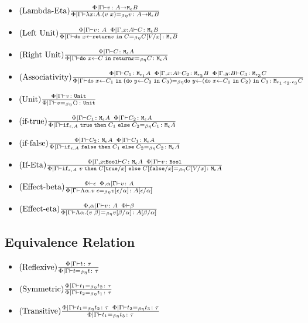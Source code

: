{\begin{itemize}
    \item $\treerule{Lambda-Eta}{\gpetyperelation{v}{\aeb}}{\gpeberelation{\lam{x}{A}{(\apply{v}{x}})}{v}{\aeb}}$
 

    \item $\treerule{Left Unit}{\gpetyperelation{v}{A} \s\s \etyperelation{\P}{\gax}{C}{\meb}}{\gpeberelation{\doin{x}{\return{v}}{C}}{C\ssub{x}{V}}{\meb}}$
    
    \item $\treerule{Right Unit}{\gpetyperelation{C}{\mea}}{\gpeberelation{\doin{x}{C}{\return{x}} }{C}{\mea}}$
    \item $\treerule{Associativity}{\gpetyperelation{C_1}{\M{\e_1}{A}} \s\s \etyperelation{\P}{\gax}{C_2}{\M{\e_2}{B}}\s\s \etyperelation{\P}{\gby}{C_3}{\M{\e_3}{C}}}{
        \gpeberelation{\doin{x}{C_1}{(\doin{y}{C_2}{C_3})}}{\doin{y}{(\doin{x}{C_1}{C_2})}{C_3}}{\M{\e_1 \dot \e_2 \dot \e_3}{C}}
    }$

    \item $\treerule{Unit}{\gpetyperelation{v}{\U}}{\gpeberelation{v}{\u}{\U}}$

    \item $\treerule{if-true}{\gpetyperelation{C_1}{\mea}\s\s\gpetyperelation{C_2}{\mea}}{\gpeberelation{\ifthenelse{\e}{A}{\t}{C_1}{C_2}}{C_1}{\mea}}$
    
    \item $\treerule{if-false}{\gpetyperelation{C_2}{\mea}\s\s\gpetyperelation{C_1}{\mea}}{\gpeberelation{\ifthenelse{\e}{A}{\f}{C_1}{C_2}}{C_2}{\mea}}$
    
    \item $\treerule{If-Eta}{\etyperelation{\P}{\G, x: \B}{C}{\mea}\s\s\gpetyperelation{v}{\B}}{\gpeberelation{\ifthenelse{\e}{A}{v}{C\ssub{x}{\t}}{C\ssub{x}{\f}}}{C\ssub{x}{V}}{\mea}}$
    
    \item $\treerule{Effect-beta}{\wellformed{\P}{\e}\s\s\etyperelation{\P, \a}{\G}{v}{A}}{\gpeberelation{\eapp{\elam{\a}{v}}{\e}}{v\ssub{\a}{\e}}{A\ssub{\a}{\e}}}$

    \item $\treerule{Effect-eta}{\etyperelation{\P,\a}{\G}{v}{A}\s\s\wellformed{\P}{\b}}{\gpeberelation{\elam{\a}{(\eapp{v}{\b})}}{v\ssub{\a}{\b}}{A\ssub{\a}{\b}}}$
    
\end{itemize}
\subsection{Equivalence Relation}
\begin{itemize}
    \item $\treerule{Reflexive}{\gpetyperelation{t}{\tau}}{\gpeberelation{t}{t}{\tau}}$
    \item $\treerule{Symmetric}{\gpeberelation{t_1}{t_2}{\tau}}{\gpeberelation{t_2}{t_1}{\tau}}$
    \item $\treerule{Transitive}{\gpeberelation{t_1}{t_2}{\tau}\s\s\gpeberelation{t_2}{t_3}{\tau}}{\gpeberelation{t_1}{t_3}{\tau}}$
\end{itemize}
}
